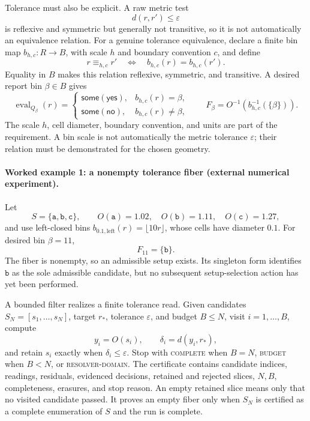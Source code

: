 Tolerance must also be explicit.  A raw metric test
\[
                           d(r,r')\le\varepsilon
\]
is reflexive and symmetric but generally not transitive, so it is not automatically an equivalence relation.  For a
genuine tolerance equivalence, declare a finite bin map \(b_{h,c}:R\to B\), with scale \(h\) and boundary convention
\(c\), and define
\[
                 r\equiv_{h,c} r'
                 \quad\Longleftrightarrow\quad
                 b_{h,c}(r)=b_{h,c}(r').
\]
Equality in \(B\) makes this relation reflexive, symmetric, and transitive.  A desired report bin \(\beta\in B\) gives
\[
 \operatorname{eval}_{Q_\beta}(r)=
   \begin{cases}
   \mathsf{some}(\mathsf{yes}),&b_{h,c}(r)=\beta,\\
   \mathsf{some}(\mathsf{no}),&b_{h,c}(r)\ne\beta,
   \end{cases}
 \qquad
 F_\beta=O^{-1}(b_{h,c}^{-1}(\{\beta\})).
\]
The scale \(h\), cell diameter, boundary convention, and units are part of the requirement.  A bin scale is not
automatically the metric tolerance \(\varepsilon\); their relation must be demonstrated for the chosen geometry.

\paragraph{Worked example 1: a nonempty tolerance fiber (external numerical experiment).}
Let
\[
 S=\{\mathtt a,\mathtt b,\mathtt c\},\qquad
 O(\mathtt a)=1.02,\quad O(\mathtt b)=1.11,\quad O(\mathtt c)=1.27,
\]
and use left-closed bins \(b_{0.1,\mathrm{left}}(r)=\lfloor10r\rfloor\), whose cells have diameter \(0.1\).
For desired bin \(\beta=11\),
\[
                         F_{11}=\{\mathtt b\}.
\]
The fiber is nonempty, so an admissible setup exists.  Its singleton form identifies \(\mathtt b\) as the sole
admissible candidate, but no subsequent setup-selection action has yet been performed.

A bounded filter realizes a finite tolerance read.  Given candidates
\(S_N=[s_1,\ldots,s_N]\), target \(r_*\), tolerance \(\varepsilon\), and budget \(B\le N\), visit
\(i=1,\ldots,B\), compute
\[
 y_i=O(s_i),\qquad \delta_i=d(y_i,r_*),
\]
and retain \(s_i\) exactly when \(\delta_i\le\varepsilon\).  Stop with \textsc{complete} when \(B=N\),
\textsc{budget} when \(B<N\), or \textsc{resolver-domain}.  The certificate contains candidate indices, readings,
residuals, evidenced decisions, retained and rejected slices, \(N,B\), completeness, erasures, and stop reason.  An
empty retained slice means only that no visited candidate passed.  It proves an empty fiber only when \(S_N\) is
certified as a complete enumeration of \(S\) and the run is complete.

